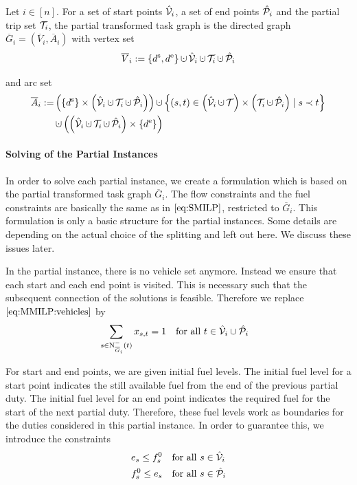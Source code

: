 \begin{definition}

Let $i\in[n]$. For a set of start points $\hat{\mathcal{V}}_i$, a set of end points $\hat{\mathcal{P}}_i$ and the partial trip set $\mathcal{T}_i$, the partial transformed task graph is the directed graph $\overline{G}_i=\left(\overline{V}_i,\overline{A}_i\right)$ with vertex set
\begin{align*}
	\overline{V}_i := \left\{\ds,\de\right\}\cupdot\Vhat_i\cupdot\Ti\cupdot\Phat_i
\end{align*}

and arc set
\begin{align*}
	\overline{A}_i := & \left(\left\{\ds\right\}\times\left(\Vhat_i\cupdot\Ti\cupdot\Phat_i\right)\right)\cupdot\left\{(s,t)\in\left(\Vhat_i\cupdot\mathcal{T}\right)\times\left(\Ti\cupdot\Phat_i\right)\mid s\prec t\right\} \\
	& \cupdot\left(\left(\Vhat_i\cupdot\Ti\cupdot\Phat_i\right)\times\left\{\de\right\}\right)
\end{align*}

\end{definition}

\paragraph{Solving of the Partial Instances} \parfill

In order to solve each partial instance, we create a formulation which is based on the partial transformed task graph $\overline{G}_i$. The flow constraints and the fuel constraints are basically the same as in $\eqref{eq:SMILP}$, restricted to $\overline{G}_i$. This formulation is only a basic structure for the partial instances. Some details are depending on the actual choice of the splitting and left out here. We discuss these issues later.

In the partial instance, there is no vehicle set anymore. Instead we ensure that each start and each end point is visited. This is necessary such that the subsequent connection of the solutions is feasible. Therefore we replace $\eqref{eq:MMILP:vehicles}$ by
\begin{align}
	& \sum_{s\in\operatorname{N}_{\overline{G}_i}^-(t)} x_{s,t} = 1 && \text{for all } t\in\hat{\mathcal{V}}_i\cup\hat{\mathcal{P}}_i \label{eq:CMILP:start_end_points}
\end{align}

For start and end points, we are given initial fuel levels. The initial fuel level for a start point indicates the still available fuel from the end of the previous partial duty. The initial fuel level for an end point indicates the required fuel for the start of the next partial duty. Therefore, these fuel levels work as boundaries for the duties considered in this partial instance. In order to guarantee this, we introduce the constraints
\begin{align}
	& e_s \leq f^0_s && \text{for all } s\in\hat{\mathcal{V}}_i \label{eq:CMILP:initial_fuel} \\
	& f^0_s \leq e_s && \text{for all } s\in\hat{\mathcal{P}}_i \label{eq:CMILP:final_fuel}
\end{align}

